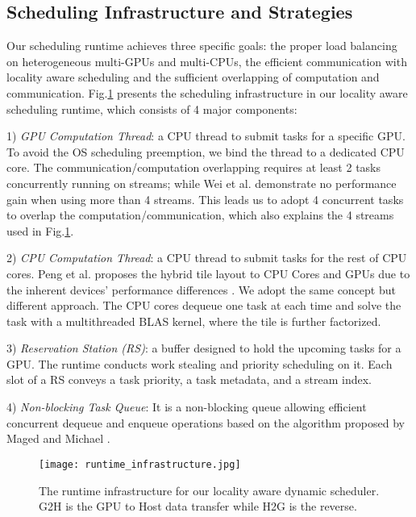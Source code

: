 \documentclass[conference]{IEEEtran}
\begin{document}
\vspace{-0.12in}
\subsection{Scheduling Infrastructure and Strategies}
\vspace{-0.05in}
Our scheduling runtime achieves three specific goals: the proper load balancing on heterogeneous 
multi-GPUs and multi-CPUs, the efficient communication with locality aware scheduling and the
sufficient overlapping of computation and communication. Fig.\ref{scheduling_infrastructure} 
presents the scheduling infrastructure in our locality aware scheduling
runtime, which consists of 4 major components:

\vspace{-0.1in}
1) \textit{GPU Computation Thread}: a CPU thread to submit tasks for a 
specific GPU. To avoid the OS scheduling preemption, we bind the thread to a 
dedicated CPU core. The communication/computation overlapping requires at least 
2 tasks concurrently running on streams; while Wei et al.\cite{PaRSEC} demonstrate no 
performance gain when using more than 4 streams. This leads us to adopt 4 concurrent tasks to overlap
the computation/communication, which also explains the 4 streams used in Fig.\ref{scheduling_infrastructure}.

\vspace{-0.1in}
2) \textit{CPU Computation Thread}: a CPU thread to submit tasks for the rest of CPU cores. 
Peng et al. proposes the hybrid tile layout to CPU Cores and GPUs due to the inherent devices' performance 
differences \cite{hybridtile}. 
We adopt the same concept but different approach. The CPU cores dequeue one task at each time and solve 
the task with a multithreaded BLAS kernel, where the tile is further factorized.

\vspace{-0.1in}
3) \textit{Reservation Station (RS)}: a buffer designed to hold the upcoming 
tasks for a GPU. The runtime conducts work stealing
and priority scheduling on it. Each slot of a RS conveys a task priority, a task metadata, 
and a stream index.

\vspace{-0.1in}
4) \textit{Non-blocking Task Queue}: It is a non-blocking queue allowing
efficient concurrent dequeue and enqueue operations based on the algorithm proposed by 
Maged and Michael \cite{nbqueue}.

\begin{figure}
\vspace{-0.1in}
\centering
\texttt{[image: runtime\_infrastructure.jpg]}
\caption{The runtime infrastructure for our locality aware dynamic scheduler. G2H is 
the GPU to Host data transfer while H2G is the reverse.}
\label{scheduling_infrastructure}
\vspace{-0.25in}
\end{figure}
\end{document}
